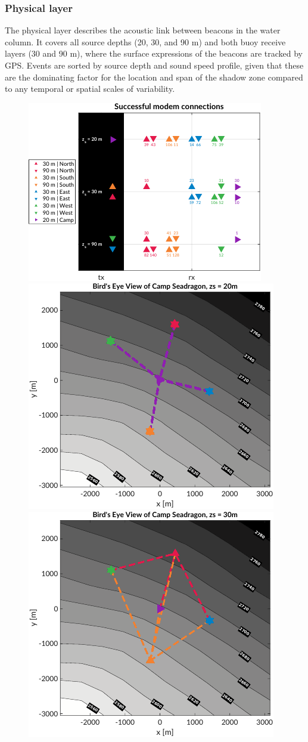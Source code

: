 \subsubsection{Physical layer}
The physical layer describes the acoustic link between beacons in the water column.
It covers all source depths (20, 30, and 90 m) and both buoy receive layers (30 and 90 m), where the surface expressions of the beacons are tracked by GPS.
Events are sorted by source depth and sound speed profile, given that these are the dominating factor for the location and span of the shadow zone compared to any temporal or spatial scales of variability.


\begin{figure}[h!]
  \centering
  \includegraphics[width=.51\textwidth]{figs/Fig3a.pdf} \hfill
  \includegraphics[width=.48\textwidth]{figs/Fig3b.pdf} \\
  \vspace{1em}
  \includegraphics[width=.48\textwidth]{figs/Fig3c.pdf} \hfill

\end{figure}
